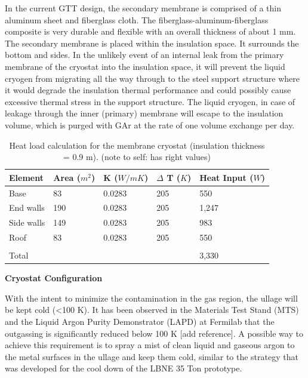 In the current GTT design, the secondary membrane is comprised of a thin aluminum sheet and 
fiberglass cloth. The fiberglass-aluminum-fiberglass composite is very durable and flexible with an 
overall thickness of about 1 mm. The secondary membrane is placed within the insulation space. It 
surrounds the bottom and sides. In the unlikely event of an internal leak from the primary membrane of 
the cryostat into the insulation space, it will prevent the liquid cryogen from migrating all the way 
through to the steel support structure where it would degrade the insulation thermal performance and 
could possibly cause excessive thermal stress in the support structure. The liquid cryogen, in case of 
leakage through the inner (primary) membrane will escape to the insulation volume, which is purged with 
GAr at the rate of one volume exchange per day.

\begin{table}[htpb]
\caption{Heat load calculation for the membrane cryostat (insulation thickness = 0.9 m). (note to self: has right values)}
\label{tbl:heat-load-calc}
\centering
\begin{tabular}{|p{}|p{}|p{}|p{}|p{}|}
\hline
 \textbf{Element} & \textbf{Area ($m^2$)}  &  \textbf{K ($W/mK$)} & \textbf{$\Delta$ T ($K$)}
 & \textbf{Heat Input ($W$)}\\ \hline
Base   & 83  & 0.0283   &205   & 550 \\ \hline
End walls  &  190 & 0.0283  &  205 &  1,247\\ \hline
Side walls   & 149  & 0.0283  &  205 & 983 \\ \hline
Roof  &  83 & 0.0283  & 205  &  550\\ \hline
   &   &   &   &  \\ \hline
Total   &   &   &   & 3,330 \\ \hline
\end{tabular}
\end{table}

\textbf{Cryostat Configuration}

With the intent to minimize the contamination in the gas region, the ullage will be kept cold (\textless 100 K). It has been observed in the Materials Test Stand (MTS) and the Liquid Argon Purity Demonstrator (LAPD) at Fermilab that the outgassing is significantly reduced below 100 K [add reference]. A possible way to achieve this requirement is to spray a mist of clean liquid and gaseous argon to the metal surfaces in the ullage and keep them cold, similar to the strategy that was developed for the cool down of the LBNE 35 Ton prototype.

